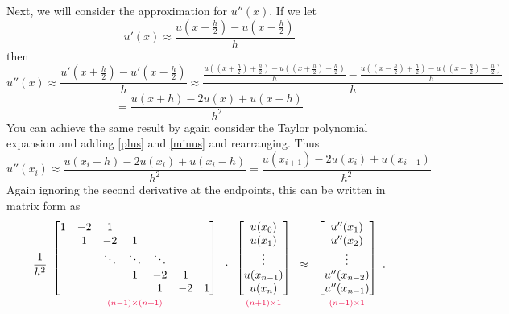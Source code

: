 \noindent Next, we will consider the approximation for $u''(x)$.
If we let
\[u'(x) \approx \frac{u(x+\frac{h}{2})-u(x-\frac{h}{2})}{h}\]
then
\[u''(x) \approx \frac{u'(x+\frac{h}{2})-u'(x-\frac{h}{2})}{h} \approx \frac{\frac{u((x+\frac{h}{2})+\frac{h}{2})-u((x+\frac{h}{2})-\frac{h}{2})}{h}-\frac{u((x-\frac{h}{2})+\frac{h}{2})-u((x-\frac{h}{2})-\frac{h}{2})}{h}}{h}\]
\[= \frac{u(x+h) - 2u(x) + u(x-h)}{h^2}\]
You can achieve the same result by again consider the Taylor polynomial expansion and adding \eqref{plus} and \eqref{minus} and rearranging.
Thus
\[u''(x_i) \approx \frac{u(x_i+h) - 2u(x_i) + u(x_i-h)}{h^2}= \frac{u(x_{i+1}) - 2u(x_i) + u(x_{i-1})}{h^2}\]
Again ignoring the second derivative at the endpoints, this can be written in matrix form as
\begin{align}
\frac{1}{h^2}
\begin{array}{c}
\begin{bmatrix}
1 & -2 & 1 & \\
& 1 & -2 & 1  \\
& &\ddots &\ddots & \ddots  \\
& & & 1 & -2 & 1 \\
& & & & 1 & -2 & 1
\end{bmatrix}\\
{\scriptstyle\textcolor{red}{(n-1)\times(n+1)}}
\end{array}\cdot
\begin{array}{c}
\begin{bmatrix}
u(x_0) \\ u(x_1)\\ \vdots  \\ u(x_{n-1}) \\ u(x_n)
\end{bmatrix}\\
{\scriptstyle\textcolor{red}{(n+1)\times1}}
\end{array}
 \approx
 \begin{array}{c}
\begin{bmatrix}
u''(x_1) \\ u''(x_2)\\ \vdots  \\ u''(x_{n-2}) \\ u''(x_{n-1})
\end{bmatrix}\\
{\scriptstyle\textcolor{red}{(n-1)\times1}}
\label{finitedifference2:uppp}
\end{array}.
\end{align}

